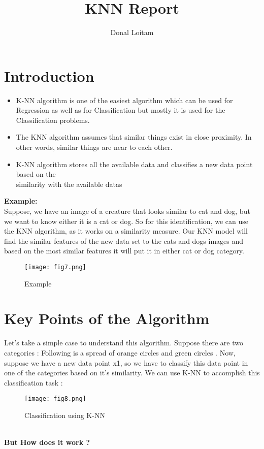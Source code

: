 \documentclass[a4paper, 11pt]{article}
\title{KNN Report}
\author{Donal Loitam}
\begin{document}
\maketitle
\tableofcontents

\section{Introduction}
\begin{itemize}
    \item K-NN algorithm is one of the easiest algorithm which can be used for Regression as well as for Classification but mostly it is used for the Classification problems.
    \item  The KNN algorithm assumes that similar things exist in close proximity. In other words, similar things are near to each other.
    \item K-NN algorithm stores all the available data and classifies a new data point based on the \\similarity with the available datas
\end{itemize}
\textbf{Example:}\\
 Suppose, we have an image of a creature that looks similar to cat and dog, but we want to know either it is a cat or dog. So for this identification, we can use the KNN algorithm, as it works on a similarity measure. Our KNN model will find the similar features of the new data set to the cats and dogs images and based on the most similar features it will put it in either cat or dog category.
 \begin{figure}[ht!]
    \texttt{[image: fig7.png]}
    \caption{Example}
    \label{fig:fig7}
  \end{figure}

\section{Key Points of the Algorithm}
Let’s take a simple case to understand this algorithm. Suppose there are two categories 
: Following is a spread of orange circles and green circles . Now, suppose we have a new data point x1, so we have to classify this data point in one of the categories 
based on it's similarity. We can use K-NN to accomplish this classification task :\\
\begin{figure}[ht!]
    \texttt{[image: fig8.png]}
    \caption{Classification using K-NN}
    \label{fig:fig8}
  \end{figure}
\vspace{3mm}\\
\textbf{But How does it work ?}  \\
\end{document}
